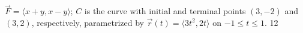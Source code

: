 {$\vec F = \langle x+y,x-y\rangle$; $C$ is the curve with initial and terminal points $(3,-2)$ and $(3,2)$, respectively, parametrized by $\vec r(t) = \langle 3t^2,2t\rangle$ on $-1\leq t\leq 1$.
}
{12
}

